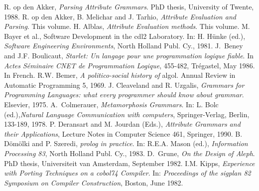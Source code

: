 \begin{thebibliography}{10}
\vspace{-2mm}
R. op den Akker,
{\em Parsing Attribute Grammars}.
PhD thesis, University of Twente, 1988.
\vspace{-2mm}
R. op den Akker, B. Melichar and J. Tarhio,
{\em Attribute Evaluation and Parsing}.
This volume.
\vspace{-2mm}
H. Alblas,
{\em Attribute Evaluation methods}. This volume.
\vspace{-2mm}
M. Bayer et al.,
{Software Development in the {{\sc cdl2}} Laboratory}.
In: H. H\"unke (ed.), {\em Software Engineering Environments},
North Holland Publ. Cy., 1981.
\vspace{-2mm}
J.~Beney and J.F. Boulicaut,
{\em Starlet: Un langage pour une programmation logique fiable}.
In {\em Actes S\'{e}minaire {CNET} de Programmation Logique}, 455-482,
Tr\'{e}gastel, May 1986.
In French.
\vspace{-2mm}
R.W. Bemer,
{\em A politico-social history of} {\sc algol}.
Annual Review in Automatic Programming 5, 1969.
\vspace{-2mm}
J. Cleaveland and R. Uzgalis,
{\em Grammars for Programming Languages: what every programmer should
know about grammar}.
Elsevier, 1975.
\vspace{-2mm}
A.~Colmerauer,
{\em Metamorphosis Grammars}.
In: L. Bolc (ed.),{\em Natural Language Communication with computers},
Springer-Verlag, Berlin, 133-189, 1978.
\vspace{-2mm}
P. Deransart and M. Jourdan (Eds.), {\em Attribute Grammars and
their Applications},
Lecture Notes in Computer Science 461, Springer, 1990.
\vspace{-2mm}
B. D\"om\"olki and P. Szeredi,
{\em {{\sc prolog}} in practice}.
In: R.E.A. Mason (ed.), {\em Information Processing 83},
North Holland Publ. Cy., 1983.
\vspace{-2mm}
D.~Grune,
{\em On the Design of {{\sc Aleph}}}.
PhD thesis, Universiteit van Amsterdam, September 1982.
\vspace{-2mm}
I.M. Kipps,
{\em Experience with Porting Techniques on a {{\sc cobol74}} Compiler}.
In: {\em Proceedings of the {\sc sigplan 82} Symposium on Compiler
Construction},
Boston, June 1982.
\vspace{-2mm}

\end{thebibliography}
